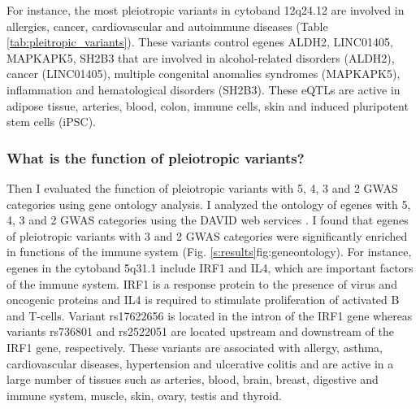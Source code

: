 For instance, the most pleiotropic variants in cytoband 12q24.12 are involved in allergies, cancer, cardiovascular and autoimmune diseases (Table \ref{tab:pleitropic_variants}).
%
These variants control egenes ALDH2, LINC01405, MAPKAPK5, SH2B3 that are involved in alcohol-related disorders (ALDH2), cancer (LINC01405), multiple congenital anomalies syndromes (MAPKAPK5),  inflammation and hematological disorders (SH2B3).
%
These eQTLs are active in adipose tissue, arteries, blood, colon, immune cells, skin and induced pluripotent stem cells (iPSC).

\subsubsection*{What is the function of pleiotropic variants?}

Then I evaluated the function of pleiotropic variants with 5, 4, 3 and 2 GWAS categories using gene ontology analysis.
%
I analyzed the ontology of egenes with 5, 4, 3 and 2 GWAS categories using the DAVID web services \citep{2008.Lempicki.Huang,2008.Lempicki.Huang.NucleicAcidsResearch}.
%
I found that egenes of pleiotropic variants with 3 and 2 GWAS categories were significantly enriched in functions of the immune system (Fig. \ref{s:results}{fig:geneontology}).
For instance, egenes in the cytoband 5q31.1 include IRF1 and IL4, which are important factors of the immune system.
%
IRF1 is a response protein to the presence of virus and oncogenic proteins and IL4 is required to stimulate proliferation of activated B and T-cells.
%
Variant rs17622656 is located in the intron of the IRF1 gene whereas variants rs736801 and rs2522051 are located upstream and downstream of the IRF1 gene, respectively.
%
These variants are associated with allergy, asthma, cardiovascular diseases, hypertension and ulcerative colitis and are active in a large number of tissues such as arteries, blood, brain, breast, digestive and immune system, muscle, skin, ovary, testis and thyroid.


%


